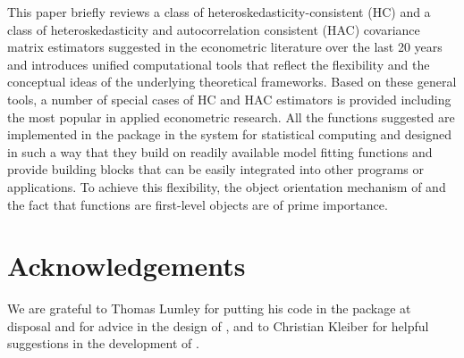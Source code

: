 \documentclass{Z}
\begin{document}
This paper briefly reviews a class of heteroskedasticity-consistent (HC)
and a class of heteroskedasticity and autocorrelation consistent (HAC)
covariance matrix estimators suggested in the econometric literature over
the last 20 years and introduces unified computational tools that reflect
the flexibility and the conceptual ideas of the underlying theoretical 
frameworks. Based on these general tools, a number of special cases of
HC and HAC estimators is provided including the most popular
in applied econometric research. All the functions suggested are implemented
in the package  in the  system for statistical 
computing and designed in such a way that they build on readily available
model fitting functions and provide building blocks that can be easily
integrated into other programs or applications. To achieve this flexibility,
the object orientation mechanism of  and the fact that functions
are first-level objects are of prime importance. 


\section*{Acknowledgements}

We are grateful to Thomas Lumley for putting his code in the
 package at disposal and for advice in the design
of , and to Christian Kleiber for helpful suggestions
in the development of .




\clearpage
\end{document}
